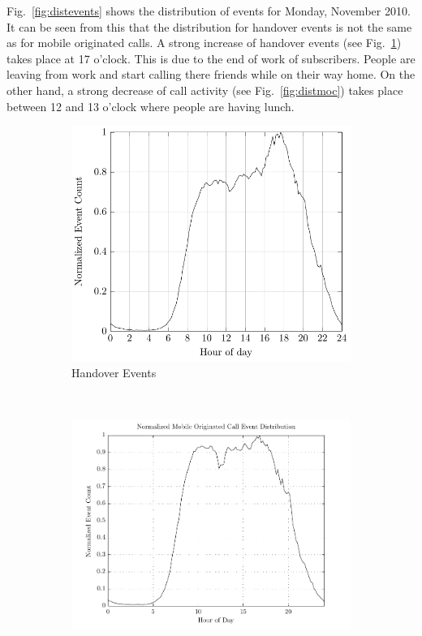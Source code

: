 Fig.~\ref{fig:distevents} shows the distribution of events for Monday,  November 2010. It can be seen from this that the distribution for handover events is not the same as for mobile originated calls. A strong increase of handover events (see Fig.~\ref{fig:disthandover}) takes place at 17 o'clock. This is due to the end of work of subscribers. People are leaving from work and start calling there friends while on their way home. On the other hand, a strong decrease of call activity (see Fig.~\ref{fig:distmoc}) takes place between 12 and 13 o'clock where people are having lunch.
\begin{figure}
	\centering
	\begin{subfigure}[b]{0.5\textwidth}
		\includegraphics[width=\textwidth]{./images/hauf_event_32_time_mat}
		\caption{Handover Events}
		\label{fig:disthandover}
	\end{subfigure}%
	~ %
	\begin{subfigure}[b]{0.5\textwidth}
		\includegraphics[width=\textwidth]{./images/hauf_event_34_time_mat}

\end{subfigure}
\end{figure}
